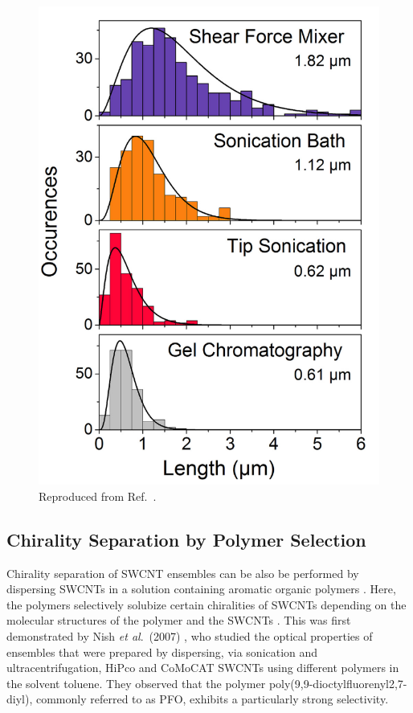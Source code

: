 \begin{figure}[H]
	\centering
	\includegraphics[scale=0.4]{images/chapter_methods/lengths_graf}
	\caption{Reproduced from Ref.\ \cite{graf2016large}.}
\end{figure}

\subsection{Chirality Separation by Polymer Selection}

Chirality separation of SWCNT ensembles can be also be performed by dispersing SWCNTs in a solution containing aromatic organic polymers \cite{nish2007highly, chen2007toward, tange2011selective}. Here, the polymers selectively solubize certain chiralities of SWCNTs depending on the molecular structures of the polymer and the  SWCNTs \cite{nish2007highly}. This was first demonstrated by Nish \textit{et al}.\ (2007) \cite{nish2007highly}, who studied the optical properties of ensembles that were prepared by dispersing, via sonication and ultracentrifugation, HiPco and CoMoCAT SWCNTs using different polymers in the solvent toluene. They observed that the polymer poly(9,9-dioctylfluorenyl2,7-diyl), commonly referred to as PFO, exhibits a particularly strong selectivity.

